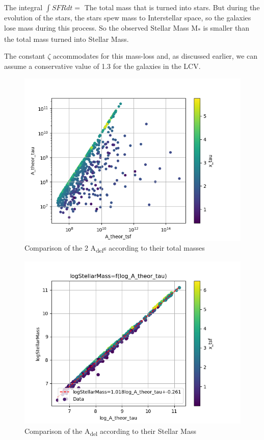 \documentclass[a4paper,twocolumn]{article}
\begin{document}
The integral \(\int SFR dt=\) The total mass that is turned into stars. But during the evolution of the stars, the stars spew mass to Interstellar space, so the galaxies lose mass during this process. So the observed Stellar Mass M\textsubscript{*} is smaller than the total mass turned into Stellar Mass.

The constant \(\zeta\) accommodates for this mass-loss and, as discussed earlier, we can assume a conservative value of 1.3 for the galaxies in the LCV.


\begin{figure}[!htpb]
\centering
\includegraphics[width=.9\linewidth]{./figs/A_theor_tau-M*.png}
\caption{\label{fig:Comparison of the 2 A_{del}s according to their total masses}Comparison of the 2 A\textsubscript{del}s according to their total masses}
\end{figure}

\begin{figure}[!htpb]
\centering
\includegraphics[width=.9\linewidth]{./figs/log_A_theor_tau-logStellarMass-color_x_tsf.png}
\caption{\label{fig:Comparison of the A_del according to their Stellar Mass}Comparison of the A\textsubscript{del} according to their Stellar Mass}
\end{figure}
\end{document}
